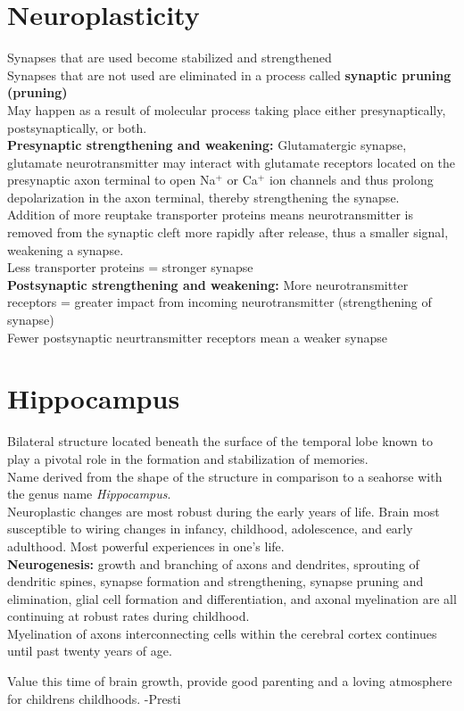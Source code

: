 \documentclass{article}
\begin{document}
\section{Neuroplasticity}
Synapses that are used become stabilized and strengthened \\
Synapses that are not used are eliminated in a process called \textbf{synaptic pruning (pruning)} \\
May happen as a result of molecular process taking place either presynaptically, postsynaptically, or both. \\
\textbf{Presynaptic strengthening and weakening:}
Glutamatergic synapse, glutamate neurotransmitter may interact with glutamate receptors located on the presynaptic axon terminal to open Na$^+$ or Ca$^+$ ion channels and thus prolong depolarization in the axon terminal, thereby strengthening the synapse. \\
Addition of more reuptake transporter proteins means neurotransmitter is removed from the synaptic cleft more rapidly after release, thus a smaller signal, weakening a synapse. \\
Less transporter proteins = stronger synapse \\
\textbf{Postsynaptic strengthening and weakening:} 
More neurotransmitter receptors = greater impact from incoming neurotransmitter (strengthening of synapse) \\
Fewer postsynaptic neurtransmitter receptors mean a weaker synapse \\

\section{Hippocampus}
Bilateral structure located beneath the surface of the temporal lobe known to play a pivotal role in the formation and stabilization of memories. \\
\indent Name derived from the shape of the structure in comparison to a seahorse with the genus name \textit{Hippocampus}. \\
\indent Neuroplastic changes are most robust during the early years of life. Brain most susceptible to wiring changes in infancy, childhood, adolescence, and early adulthood. Most powerful experiences in one's life. \\

\textbf{Neurogenesis:} growth and branching of axons and dendrites, sprouting of dendritic spines, synapse formation and strengthening, synapse pruning and elimination, glial cell formation and differentiation, and axonal myelination are all continuing at robust rates during childhood. \\
Myelination of axons interconnecting cells within the cerebral cortex continues until past twenty years of age. \\
\bigskip 

\begin{center}
    Value this time of brain growth, provide good parenting and a loving atmosphere for childrens childhoods. -Presti
\end{center}
\end{document}
